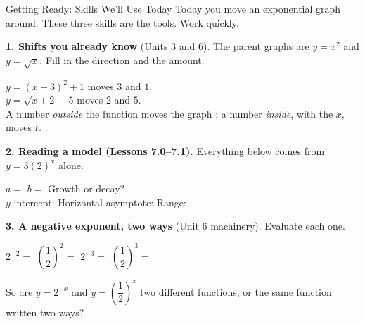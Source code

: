 \documentclass[10pt]{article}
\begin{document}
\namedateperiod

\vspace{0.10in}

\begin{notesbox}{Getting Ready: Skills We'll Use Today}
\small Today you move an exponential graph around. These three skills are the tools. Work quickly.

\vspace{4pt}
\textbf{1. Shifts you already know} (Units 3 and 6). The parent graphs are $y=x^{2}$ and
$y=\sqrt{x}$. Fill in the direction and the amount.

\vspace{3pt}
\hspace*{1.2em} $y=(x-3)^{2}+1$ \; moves \blank{1.6cm} $3$ \; and \blank{1.6cm} $1$. \\[3pt]
\hspace*{1.2em} $y=\sqrt{x+2}-5$ \; moves \blank{1.6cm} $2$ \; and \blank{1.6cm} $5$. \\[3pt]
\hspace*{1.2em} A number \emph{outside} the function moves the graph \blank{2.4cm}; a number
\emph{inside}, with the $x$, moves it \blank{2.4cm}.

\vspace{6pt}
\textbf{2. Reading a model (Lessons 7.0--7.1).} Everything below comes from $y=3(2)^{x}$ alone.

\vspace{3pt}
\hspace*{1.2em} $a=$ \blank{1.4cm} \quad $b=$ \blank{1.4cm} \quad Growth or decay?
\blank{2.0cm} \\[4pt]
\hspace*{1.2em} $y$-intercept: \blank{2.0cm} \quad Horizontal asymptote: \blank{2.0cm} \quad
Range: \blank{2.4cm}

\vspace{6pt}
\textbf{3. A negative exponent, two ways} (Unit 6 machinery). Evaluate each one.

\vspace{3pt}
\hspace*{1.2em} $2^{-2}=$ \blank{1.4cm} \qquad $\left(\dfrac{1}{2}\right)^{2}=$ \blank{1.4cm}
\qquad $2^{-3}=$ \blank{1.4cm} \qquad $\left(\dfrac{1}{2}\right)^{3}=$ \blank{1.4cm}

\vspace{4pt}
\hspace*{1.2em} So are $y=2^{-x}$ and $y=\left(\dfrac{1}{2}\right)^{x}$ two different functions, or
the same function written two ways? \blank{4.0cm}

\end{notesbox}
\end{document}
